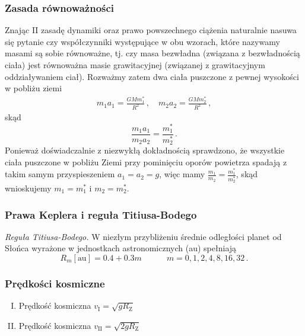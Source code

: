 \documentclass[../main.tex]{subfiles}
\begin{document}
\subsubsection{Zasada równoważności}
Znając II zasadę dynamiki oraz prawo powszechnego ciążenia naturalnie nasuwa się pytanie czy współczynniki występujące w obu wzorach, które nazywamy masami są sobie równoważne, tj. czy masa bezwładna (związana z bezwładnością ciała) jest równoważna masie grawitacyjnej (związanej z grawitacyjnym oddziaływaniem ciał). Rozważmy zatem dwa ciała puszczone z pewnej wysokości w pobliżu ziemi
\begin{equation*}
    \begin{split}
        m_1a_1=\frac{GMm_1^*}{R^2}\,,\quad m_2a_2=\frac{GMm_2^*}{R^2}\,,
    \end{split}
\end{equation*}
skąd
\begin{equation*}
    \frac{m_1a_1}{m_2a_2}=\frac{m_1^*}{m_2^*}\,.
\end{equation*}
Ponieważ doświadczalnie z niezwykłą dokładnością sprawdzono, że wszystkie ciała puszczone w pobliżu Ziemi przy pominięciu oporów powietrza spadają z takim samym przyspieszeniem \(a_1=a_2=g\), więc mamy \(\frac{m_1}{m_2}=\frac{m_1^*}{m_2^*}\), skąd wnioskujemy \(m_1=m_1^*\) i \(m_2=m_2^*\).

\subsubsection{Prawa Keplera i reguła Titiusa-Bodego}
\noindent{}
\medskip

\textit{Reguła Titiusa-Bodego.} W niezłym przybliżeniu średnie odległości planet od Słońca wyrażone w jednostkach astronomicznych (au) spełniają
\begin{equation*}
    R_{m}[\text{au}]=0.4+0.3m\quad\quad\quad m=0,1,2,4,8,16,32\,.
\end{equation*}
\subsubsection*{Prędkości kosmiczne}
\begin{enumerate}[I.]
    \item Prędkość kosmiczna \(v_\text{I}=\sqrt{gR_\text{Z}}\)
    \item Prędkość kosmiczna \(v_\text{II}=\sqrt{2gR_\text{Z}}\)
\end{enumerate}
\end{document}
